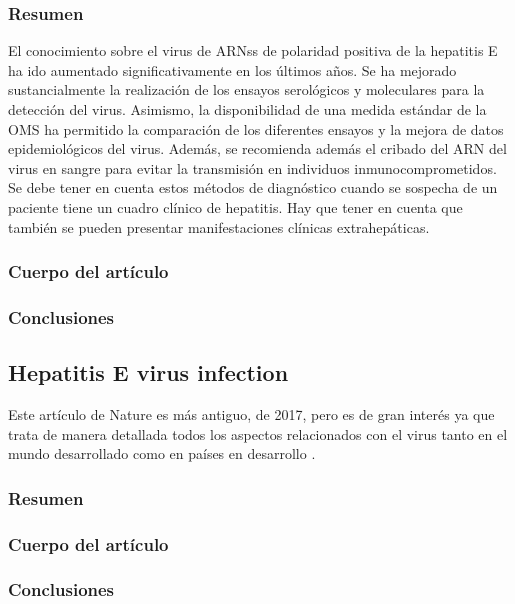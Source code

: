 \documentclass[11 pt]{article}
\begin{document}
\subsubsection{Resumen}
El conocimiento sobre el virus de ARNss de polaridad positiva de la hepatitis E ha ido aumentado significativamente en los últimos años. Se ha mejorado sustancialmente la realización de los ensayos serológicos y moleculares para la detección del virus. Asimismo, la disponibilidad de una medida estándar de la OMS ha permitido la comparación de los diferentes ensayos y la mejora de datos epidemiológicos del virus. Además, se recomienda además el cribado del ARN del virus en sangre para evitar la transmisión en individuos inmunocomprometidos. Se debe tener en cuenta estos métodos de diagnóstico cuando se sospecha de un paciente tiene un cuadro clínico de hepatitis. Hay que tener en cuenta que también se pueden presentar manifestaciones clínicas extrahepáticas. 
\subsubsection{Cuerpo del artículo}
\subsubsection{Conclusiones}

\subsection{Hepatitis E virus infection}
Este artículo de Nature es más antiguo, de 2017, pero es de gran interés ya que trata de manera detallada todos los aspectos relacionados con el virus tanto en el mundo desarrollado como en países en desarrollo \cite{Kamar2017}.
\subsubsection{Resumen}
\subsubsection{Cuerpo del artículo}
\subsubsection{Conclusiones}  
\end{document}
